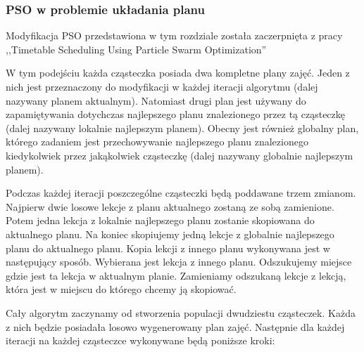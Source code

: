 \subsubsection{PSO w problemie układania planu}
\par Modyfikacja PSO przedstawiona w tym rozdziale została zaczerpnięta z pracy ,,Timetable Scheduling Using Particle Swarm Optimization'' \cite{pso}
\par W tym podejściu każda cząsteczka posiada dwa kompletne plany zajęć. Jeden z nich jest przeznaczony do modyfikacji w każdej iteracji algorytmu (dalej nazywany planem aktualnym). Natomiast drugi plan jest używany do zapamiętywania dotychczas najlepszego planu znalezionego przez tą cząsteczkę (dalej nazywany lokalnie najlepszym planem). Obecny jest również globalny plan, którego zadaniem jest przechowywanie najlepszego planu znalezionego kiedykolwiek przez jakąkolwiek cząsteczkę (dalej nazywany globalnie najlepszym planem).  
\par Podczas każdej iteracji poszczególne cząsteczki będą poddawane trzem zmianom. Najpierw dwie losowe lekcje z planu aktualnego zostaną ze sobą zamienione. Potem jedna lekcja z lokalnie najlepszego planu zostanie skopiowana do aktualnego planu. Na koniec skopiujemy jedną lekcje z globalnie najlepszego planu do aktualnego planu. Kopia lekcji z innego planu wykonywana jest w następujący sposób. Wybierana jest lekcja z innego planu. Odszukujemy miejsce gdzie jest ta lekcja w aktualnym planie. Zamieniamy odszukaną lekcje z lekcją, która jest w miejscu do którego chcemy ją skopiować. 
\par Cały algorytm zaczynamy od stworzenia populacji dwudziestu cząsteczek. Każda z nich będzie posiadała losowo wygenerowany plan zajęć. Następnie dla każdej iteracji na każdej cząsteczce wykonywane będą poniższe kroki:
